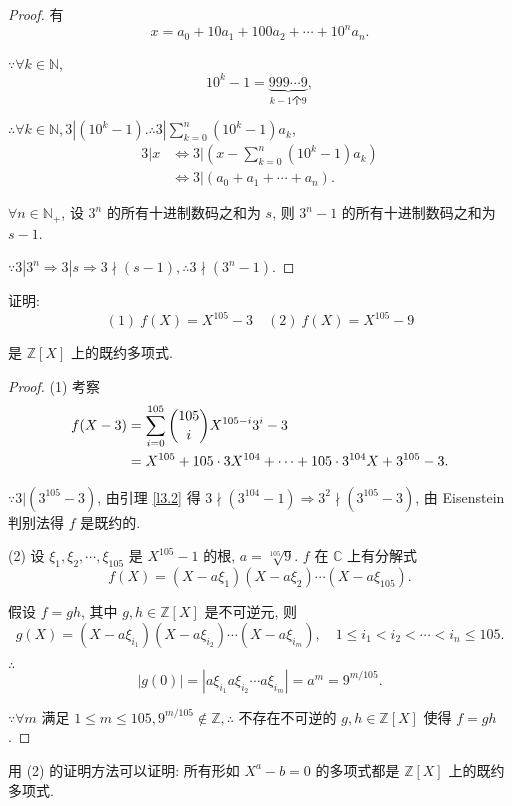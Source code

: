 \documentclass[UTF8]{ctexart}
\begin{document}
\begin{proof}
    有
    \[x=a_0+10a_1+100a_2+\cdots+10^na_n.\]

    $\because\forall k\in\mathbb{N}$,
    \[10^k-1=\underbrace{999\cdots9}_{k-1\text{个}9},\]

    $\therefore\forall k\in\mathbb{N},3|(10^k-1).\therefore3|\sum\limits_{k=0}^n(10^k-1)a_k$,
    \begin{align*}
        3|x & \Leftrightarrow3\bigg|\left(x-\sum\limits_{k=0}^n(10^k-1)a_k\right) \\
        & \Leftrightarrow3|(a_0+a_1+\cdots+a_n).
    \end{align*}

    $\forall n\in\mathbb{N}_+$, 设 $3^n$ 的所有十进制数码之和为 $s$, 则 $3^n-1$ 的所有十进制数码之和为 $s-1$.
    
    $\because3|3^n\Rightarrow3|s\Rightarrow3\nmid(s-1),\therefore3\nmid(3^n-1)$.
\end{proof}
\begin{example}
    证明:
    \[(1)\ f(X)=X^{105}-3\quad(2)\ f(X)=X^{105}-9\]

    是 $\mathbb{Z}[X]$ 上的既约多项式.
\end{example}
\begin{proof}
    (1) 考察
    \begin{align*}
        f(X-3) & =\sum\limits_{i=0}^{105}\dbinom{105}{i}X^{105-i}3^i-3 \\
        & =X^{105}+105\cdot3X^{104}+\cdots+105\cdot3^{104}X+3^{105}-3.
    \end{align*}

    $\because3|(3^{105}-3)$, 由引理 \ref{l3.2} 得 $3\nmid(3^{104}-1)\Rightarrow3^2\nmid(3^{105}-3)$, 由 Eisenstein 判别法得 $f$ 是既约的.

    (2) 设 $\xi_1,\xi_2,\cdots,\xi_{105}$ 是 $X^{105}-1$ 的根, $a=\sqrt[105]{9}$. $f$ 在 $\mathbb{C}$ 上有分解式
    \[f(X)=(X-a\xi_1)(X-a\xi_2)\cdots(X-a\xi_{105}).\]

    假设 $f=gh$, 其中 $g,h\in\mathbb{Z}[X]$ 是不可逆元, 则
    \[g(X)=(X-a\xi_{i_1})(X-a\xi_{i_2})\cdots(X-a\xi_{i_m}),\quad1\leq i_1<i_2<\cdots<i_n\leq105.\]

    $\therefore$
    \[|g(0)|=|a\xi_{i_1}a\xi_{i_2}\cdots a\xi_{i_m}|=a^m=9^{m/105}.\]

    $\because\forall m$ 满足 $1\leq m\leq105,9^{m/105}\notin\mathbb{Z},\therefore$ 不存在不可逆的 $g,h\in\mathbb{Z}[X]$ 使得 $f=gh$.
\end{proof}
\begin{note}
    用 (2) 的证明方法可以证明: 所有形如 $X^a-b=0$ 的多项式都是 $\mathbb{Z}[X]$ 上的既约多项式.
\end{note}
\end{document}
